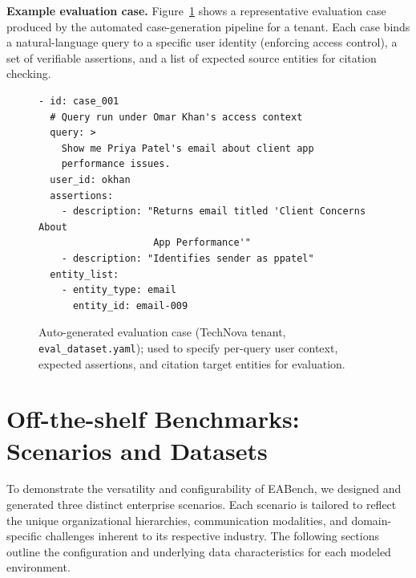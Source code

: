 \documentclass[journal,dvipsnames]{acmart}
\begin{document}
\textbf{Example evaluation case.}
Figure~\ref{lst:eval_case} shows a representative evaluation case
produced by the automated case-generation pipeline for a tenant.
Each case binds a natural-language query to a specific user identity
(enforcing access control), a set of verifiable assertions, and a list
of expected source entities for citation checking.

\begin{figure}[h]
  \centering
  
\begin{minipage}{0.9\textwidth}
\begin{lstlisting}
- id: case_001
  # Query run under Omar Khan's access context
  query: >
    Show me Priya Patel's email about client app
    performance issues.
  user_id: okhan
  assertions:
    - description: "Returns email titled 'Client Concerns About
                    App Performance'"
    - description: "Identifies sender as ppatel"
  entity_list:
    - entity_type: email
      entity_id: email-009
  \end{lstlisting}
\end{minipage}

  \caption{Auto-generated evaluation case (TechNova tenant, \texttt{eval\_dataset.yaml}); used to specify per-query user context, expected assertions, and citation target entities for evaluation.}
  \label{lst:eval_case}
\end{figure}



\section{Off-the-shelf Benchmarks: Scenarios and Datasets}
\label{sec:scenarios}

To demonstrate the versatility and configurability of EABench, we designed and generated three distinct enterprise scenarios. Each scenario is tailored to reflect the unique organizational hierarchies, communication modalities, and domain-specific challenges inherent to its respective industry. The following sections outline the configuration and underlying data characteristics for each modeled environment.
\end{document}
